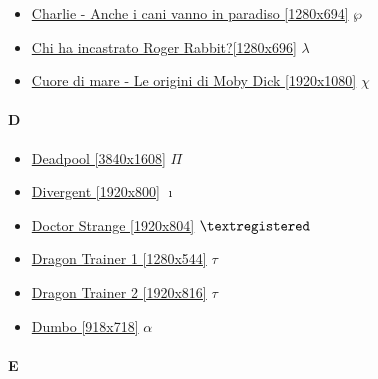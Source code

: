 \begin{itemize}
			\item \href{https://mega.nz/#!nKZU0ZqK!6mncsKMIGzYVcz9QXMbxQL2c18E6LXPl7cNXzySa3jU} {Charlie - Anche i cani vanno in paradiso [1280x694]}  $\wp$ \\ 
			\item \href{https://mega.nz/#!il4mWYyA!Soy2KyEXa2Z-hls24YVeEAiAuGHbAebe4zvN43Nc7Hw} {Chi ha incastrato Roger Rabbit?[1280x696]}  $\lambda$ \\ 
			\item \href{https://mega.nz/#!p8FlRagL!A2rf0twEcTXb2RgIiYyjIGth9uGVeLliqID9z7DX_rU} {Cuore di mare - Le origini di Moby Dick [1920x1080]}  $\chi$ \\ 
		
		\end{itemize}	
		
	\paragraph{D} \hypertarget{FID}{}
	
		\begin{itemize}
			\item \href{https://mega.nz/#!JTYkXbCb!o4m4mKoNQZmA6hfK_5LEeo8QAParOGl3GbA03QQxIEQ} {Deadpool [3840x1608]}  $\Pi$ \\
			\item \href{https://mega.nz/#!Smhh2JrQ!Cimm2Y_Q6_-g4bPvXftI5DFqK1wYXaex4pppBNov31o} {Divergent [1920x800]}  $\imath$ \\
			\item \href{https://mega.nz/#!aqZDCYxT!lrD09PNgOexpjO_FrUecKvlgMbdjCPoN1YEtxC003qw} {Doctor Strange [1920x804]}  $\textregistered$ \\
			\item \href{https://mega.nz/#!FhAlHLwL!k-GRuvg1m5S5iS4tjjCLEFQrkFdlqsQogPewtwxb8M0} {Dragon Trainer 1 [1280x544]}  $\tau$ \\ 
			\item \href{https://mega.nz/#!MpQglDiQ!r3czblnX_YSNx42hvxiAdTeP4HV7I4UqbB2NMfctJvk} {Dragon Trainer 2 [1920x816]}  $\tau$ \\ 
			\item \href{https://mega.nz/#!sF8wgBRA!cB3Ojxb49hV9NY7-vhg4SUFLyrVm0_t8z_qSuxtnhX0} {Dumbo [918x718]}  $\alpha$ \\ 
			
		\end{itemize}	
		
		
	\paragraph{E} \hypertarget{FIE}{}
	
